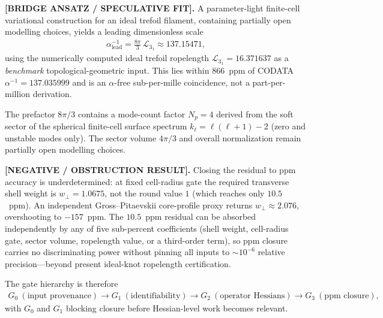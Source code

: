 \documentclass[11pt]{article}
\theoremstyle{definition}
\theoremstyle{plain}
\theoremstyle{remark}
\begin{document}
            \textbf{[BRIDGE ANSATZ / SPECULATIVE FIT].}
            A parameter-light finite-cell variational construction for an ideal trefoil filament,
            containing partially open modelling choices, yields a leading dimensionless scale
            \begin{align}
                \alpha^{-1}_{\mathrm{lead}}
                =
                \frac{8\pi}{3}\,\mathcal{L}_{3_1}
                \approx 137.15471,
                \label{eq:alpha_lead_finite_cell}
            \end{align}
            using the numerically computed ideal trefoil ropelength
            $\mathcal{L}_{3_1}=16.371637$ as a \emph{benchmark} topological-geometric input.
            This lies within $866$~ppm of CODATA $\alpha^{-1}=137.035999$ and is an
            $\alpha$-free sub-per-mille coincidence, not a part-per-million derivation.

            The prefactor $8\pi/3$ contains a mode-count factor $N_p=4$ derived from the
            soft sector of the spherical finite-cell surface spectrum
            $k_\ell=\ell(\ell+1)-2$ (zero and unstable modes only). The sector volume
            $4\pi/3$ and overall normalization remain partially open modelling choices.

            \textbf{[NEGATIVE / OBSTRUCTION RESULT].}
            Closing the residual to ppm accuracy is underdetermined: at fixed cell-radius
            gate the required transverse shell weight is $w_\perp=1.0675$, not the round
            value $1$ (which reaches only $10.5$~ppm). An independent Gross--Pitaevskii
            core-profile proxy returns $w_\perp\approx 2.076$, overshooting to $-157$~ppm.
            The $10.5$~ppm residual can be absorbed independently by any of five
            sub-percent coefficients (shell weight, cell-radius gate, sector volume,
            ropelength value, or a third-order term), so ppm closure carries no
            discriminating power without pinning all inputs to $\sim10^{-6}$ relative
            precision---beyond present ideal-knot ropelength certification.

            The gate hierarchy is therefore
            \begin{align}
                G_0\ (\text{input provenance})
                \longrightarrow
                G_1\ (\text{identifiability})
                \longrightarrow
                G_2\ (\text{operator Hessians})
                \longrightarrow
                G_3\ (\text{ppm closure}),
                \label{eq:finite_cell_gate_hierarchy}
            \end{align}
            with $G_0$ and $G_1$ blocking closure before Hessian-level work becomes relevant.
\end{document}
